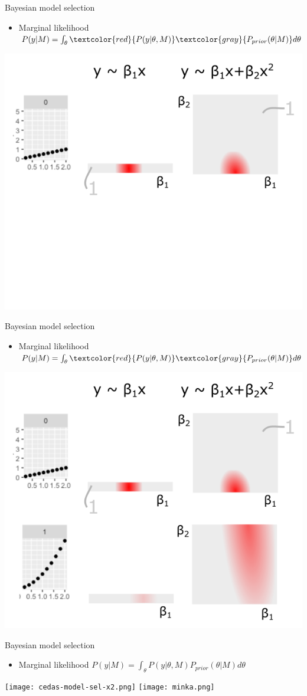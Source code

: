 \documentclass[10pt]{beamer}
\begin{document}
\begin{frame}{Bayesian model selection}
  \begin{itemize}
  \item Marginal likelihood $P(y|M) = \int_{\theta} \textcolor{red}{P(y|\theta, M)} \textcolor{gray}{P_{prior}(\theta|M)} d\theta$
  \end{itemize}
  \includegraphics[width=.7\textwidth]{bms-3.png}
\end{frame}
\begin{frame}{Bayesian model selection}
  \begin{itemize}
  \item Marginal likelihood $P(y|M) = \int_{\theta} \textcolor{red}{P(y|\theta, M)} \textcolor{gray}{P_{prior}(\theta|M)} d\theta$
  \end{itemize}
  \includegraphics[width=.7\textwidth]{bms-4.png}
\end{frame}

\begin{frame}{Bayesian model selection}
  \begin{itemize}
    \item Marginal likelihood $P(y|M) = \int_{\theta} P(y|\theta, M) P_{prior}(\theta|M) d\theta$
  \end{itemize}
  \texttt{[image: cedas-model-sel-x2.png]}
  \texttt{[image: minka.png]}
\end{frame}
\end{document}
